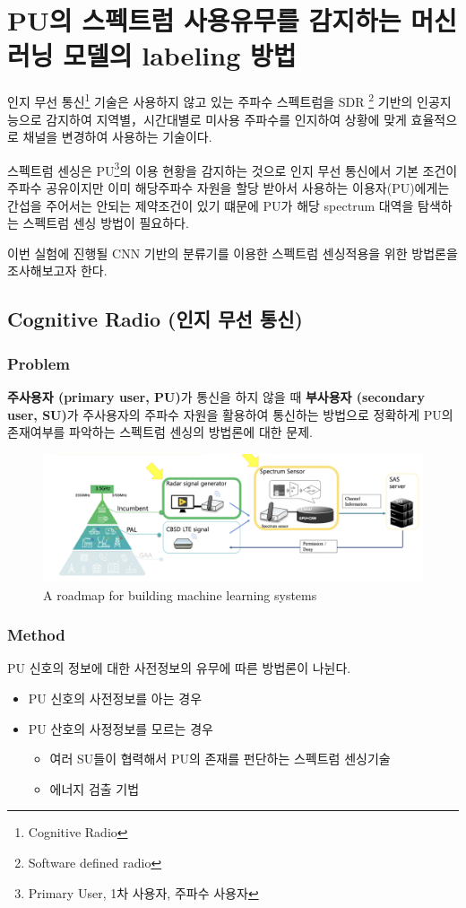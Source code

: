 \section{PU의 스펙트럼 사용유무를 감지하는 머신러닝 모델의 labeling 방법}
    인지 무선 통신\footnote{Cognitive Radio} 기술은 사용하지 않고 있는 주파수 스펙트럼을 SDR \footnote{Software defined radio} 기반의 인공지능으로 감지하여 지역별，시간대별로 미사용 주파수를 인지하여 상황에 맞게 효율적으로 채널을 변경하여 사용하는 기술이다.
    
    스펙트럼 센싱은 PU\footnote{Primary User, 1차 사용자, 주파수 사용자}의 이용 현황을 감지하는 것으로 인지 무선 통신에서  기본 조건이 주파수 공유이지만 이미 해당주파수 자원을 할당 받아서 사용하는 이용자(PU)에게는 간섭을 주어서는 안되는 제약조건이 있기 떄문에 PU가 해당 spectrum 대역을 탐색하는 스펙트럼 센싱 방법이 필요하다. 
    
    이번 실험에 진행될 CNN 기반의 분류기를 이용한 스펙트럼 센싱적용을 위한 방법론을 조사해보고자 한다.  
\subsection{Cognitive Radio (인지 무선 통신)}
    \subsubsection*{Problem}
    \textbf{주사용자 (primary user, PU)}가 통신을 하지 않을 때 \textbf{부사용자 (secondary user, SU)}가 주사용자의 주파수 자원을 활용하여 통신하는 방법으로 정확하게 PU의 존재여부를 파악하는 스펙트럼 센싱의 방법론에 대한 문제.\\
        \begin{figure}[!h]\centering
    		\includegraphics[width=.85\textwidth]{image/week04/4-0.png}
    		\caption{\small A roadmap for building machine learning systems}
    		\vspace{-10pt}
        \end{figure}
    \subsubsection*{Method}
    PU 신호의 정보에 대한 사전정보의 유무에 따른 방법론이 나뉜다. 
    \begin{itemize}
        \item PU 신호의 사전정보를 아는 경우 
        \item PU 산호의 사정정보를 모르는 경우
        \begin{itemize}
            \item 여러 SU들이 협력해서 PU의 존재를 펀단하는 스펙트럼 센싱기술 
            \item 에너지 검출 기법
        \end{itemize}
    \end{itemize}

